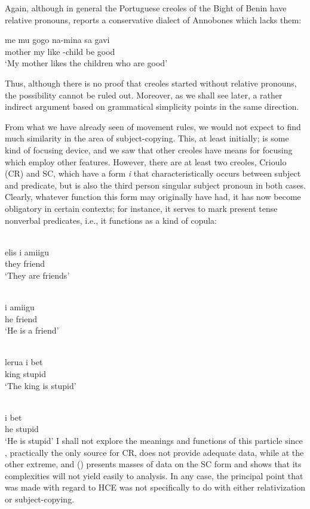 Again, although in general the Portuguese creoles of the Bight of Benin have relative pronouns, \citet[97]{Valkoff1966} reports a conserva\-tive dialect of Annobones which lacks them:

\ea\label{ex:2:43}
\gll  me mu gogo na-mina sa gavi \\
mother my like {\PL}-child be good\\
\glt `My mother likes the children who are good'
\z

Thus, although there is no proof that creoles started without relative pronouns, the possibility cannot be ruled out. Moreover, as we shall see later, a rather indirect argument based on grammatical sim\-plicity points in the same direction.

From what we have already seen of movement rules, we would not expect to find much similarity in the area of subject-copying. This, at least initially; is some kind of focusing device, and we saw that other creoles have means for focusing which employ other features. However, there are at least two creoles, Crioulo (CR) and SC, which have a form \textit{i} that characteristically occurs between subject and predicate, but is also the third person singular subject pronoun in both cases. Clearly, what\-ever function this form may originally have had, it has now become obligatory in certain contexts; for instance, it serves to mark present tense nonverbal predicates, i.e., it functions as a kind of copula:

\ea\label{ex:2:44}
\\
 \gll elis i amiigu\\
they {\PM} friend\\
\glt `They are friends'
\z

\ea\label{ex:2:45}
\\
 \gll i amiigu\\
he friend\\
\glt `He is a friend'
\z

\ea\label{ex:2:46}
\\
 \gll lerua i bet\\
king {\PM} stupid\\
\glt `The king is stupid'
\z

 

\ea\label{ex:2:47}
\\
\gll i bet\\
he stupid\\
\glt `He is stupid'
\z
I shall not explore the meanings and functions of this particle since \citet{Wilson1962}, practically the only source for CR, does not provide adequate data, while at the other extreme, \citet{Corne1974-75} and (\citeyear{Corne1977}) presents masses of data on the SC form and shows that its complexities will not yield easily to analysis. In any case, the principal point that was made with regard to HCE was not specifically to do with either relativization or subject-copying.

